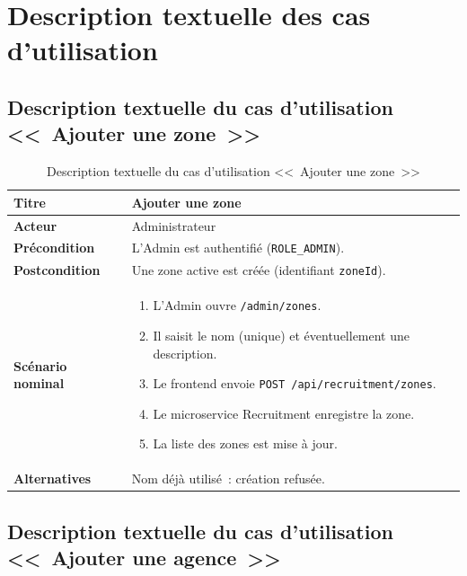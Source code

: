 \section{Description textuelle des cas d'utilisation}

\subsection{Description textuelle du cas d'utilisation <<~Ajouter une zone~>>}

\begin{table}[htbp]
  \centering
  \small
  \caption{Description textuelle du cas d'utilisation <<~Ajouter une zone~>>}
  \label{tab:uc-add-zone}
  \begin{tabular}{|p{3.0cm}|p{10.2cm}|}
    \hline
    \textbf{Titre} & Ajouter une zone \\
    \hline
    \textbf{Acteur} & Administrateur \\
    \hline
    \textbf{Précondition} & L'Admin est authentifié (\texttt{ROLE\_ADMIN}). \\
    \hline
    \textbf{Postcondition} & Une zone active est créée (identifiant \texttt{zoneId}). \\
    \hline
    \textbf{Scénario nominal}
    &
    \begin{enumerate}[leftmargin=*,itemsep=0.15em,topsep=0.2em]
      \item L'Admin ouvre \texttt{/admin/zones}.
      \item Il saisit le nom (unique) et éventuellement une description.
      \item Le frontend envoie \texttt{POST /api/recruitment/zones}.
      \item Le microservice Recruitment enregistre la zone.
      \item La liste des zones est mise à jour.
    \end{enumerate}
    \\
    \hline
    \textbf{Alternatives}
    & Nom déjà utilisé~: création refusée. \\
    \hline
  \end{tabular}
\end{table}


\subsection{Description textuelle du cas d'utilisation <<~Ajouter une agence~>>}

